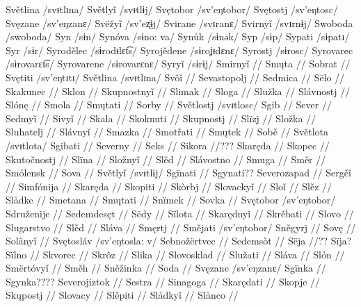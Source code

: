 Světlina /svᵻtlɪna/ 
Světlyǐ /svᵻtlɨj/ 
Svętobor /sv’eŋtobor/
Svętostj /sv’eŋtosc/
Svęzane /sv’eŋzanɛ/ 
Svëžyǐ /sv’eʐɨj/
Svirane /svɪranɛ/
Svirnyǐ /svɪrnɨj/
Swoboda /swoboda/
Syn /sɨn/
Synóva /sɨno: va/
Synůk /sɨnək/
Syp /sɨp/
Sypati /sɨpatɪ/
Syr /sɨr/
Syrodělec /sɨrodᵻlɛt͡s/
Syrojědene /sɨroʝᵻdɛnɛ/
Syrostj /sɨrosc/
Syrovarec /sɨrovarɛt͡s/
Syrovarene /sɨrovarɛnɛ/
Syryǐ /sɨrɨj/ 
Smirnyǐ //
Smųta //
Sobrat //
Svętiti /sv’eŋtɪtɪ/
Světlina /svᵻtlɪna/
Svôǐ //
Sevastopolj //
Sedmica //
Sëlo //
Skakunec //
Sklon //
Skupnostnyǐ //
Slimak //
Sloga //
Služka //
Slávnostj //
Slónę //
Smola //
Smųtati //
Sorby //
Světlostj /svᵻtlosc/
Sgib //
Sever //
Sedmyǐ //
Sivyǐ //
Skala //
Skoknuti //
Skupnostj //
Slïzj //
Složka //
Sluhatelj //
Slávnyǐ //
Smazka //
Smotřati //
Smųtek //
Sobě //
Světlota /svᵻtlota/
Sgibati //
Severny //
Seks //
Sikora //???
Skaręda //
Skopec //
Skutočnostj //
Slïna //
Složnyǐ //
Slěd //
Slávostno //
Smuga //
Směr //
Smólensk //
Sova //
Světlyǐ /svᵻtlɨj/
Sgïnati // Sgynati??
Severozapad //
Sergěǐ //
Simfónija //
Skaręda //
Skopiti //
Skòrbj //
Slovackyǐ //
Sloǐ //
Slěz //
Slådke //
Smetana //
Smųtati //
Snïmek //
Sovka //
Svętobor /sv’eŋtobor/
Sdruženije //
Sedemdesęt //
Sëdy //
Sïlota //
Skarędnyǐ //
Skrěbati //
Slovo //
Slugarstvo //
Slěd //
Sláva //
Smęrtj //
Smějati /sv’eŋtobor/
Sněgyrj //
Sovę //
Solänyǐ //
Svętosláv /sv’eŋtosla: v/
Sebnožërtvec //
Sedemsòt //
Sëja //?? Sïja?
Sïlno //
Skvorec //
Skrôz //
Slika //
Slovosklad //
Služati //
Sláva //
Slón //
Smërtóvyǐ //
Směh //
Sněžinka //
Soda //
Svęzane /sv’eŋzanɛ/
Sgïnka // Sgynka????
Severojiztok //
Sestra //
Sinagoga //
Skarędati //
Skopje //
Skųpostj //
Slovacy //
Slěpiti //
Slådkyǐ //
Slånco //
